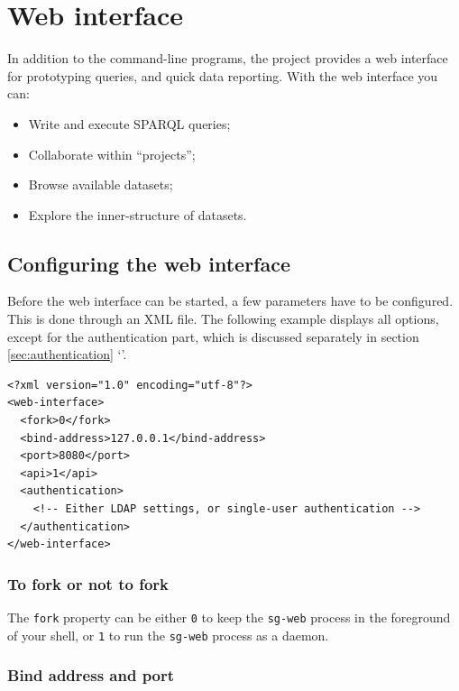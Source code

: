 \chapter{Web interface}
\label{chap:web-interface}

  In addition to the command-line programs, the project provides a web
  interface for prototyping queries, and quick data reporting.  With the
  web interface you can:
  \begin{itemize}
  \item Write and execute SPARQL queries;
  \item Collaborate within ``projects'';
  \item Browse available datasets;
  \item Explore the inner-structure of datasets.
  \end{itemize}

\section{Configuring the web interface}
\label{sec:configuring-sg-web}

  Before the web interface can be started, a few parameters have to be
  configured.  This is done through an XML file.  The following example
  displays all options, except for the authentication part, which is
  discussed separately in section \ref{sec:authentication}
  {\color{LinkGray}`'}.

\begin{siderules}
\begin{verbatim}
<?xml version="1.0" encoding="utf-8"?>
<web-interface>
  <fork>0</fork>
  <bind-address>127.0.0.1</bind-address>
  <port>8080</port>
  <api>1</api>
  <authentication>
    <!-- Either LDAP settings, or single-user authentication -->
  </authentication>
</web-interface>
\end{verbatim}
\end{siderules}

\subsection{To fork or not to fork}

  The \texttt{fork} property can be either \texttt{0} to keep the
  \texttt{sg-web} process in the foreground of your shell, or
  \texttt{1} to run the \texttt{sg-web} process as a daemon.

\subsection{Bind address and port}

